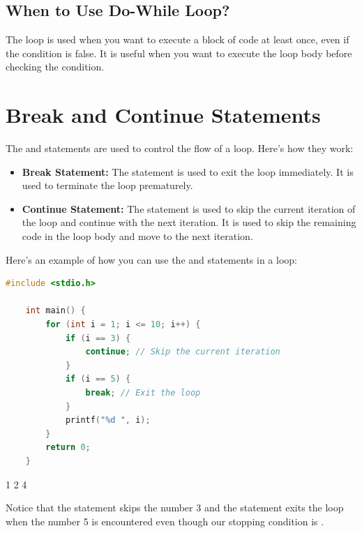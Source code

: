 \documentclass[12pt, openany]{book}
\begin{document}
\subsection{When to Use Do-While Loop?}
The  loop is used when you want to execute a block of code at least once, even if the condition is false. It is useful when you want to execute the loop body before checking the condition.

\section{Break and Continue Statements}
The  and  statements are used to control the flow of a loop. Here's how they work:
\begin{itemize}
    \item \textbf{Break Statement:} The  statement is used to exit the loop immediately. It is used to terminate the loop prematurely.
    \item \textbf{Continue Statement:} The  statement is used to skip the current iteration of the loop and continue with the next iteration. It is used to skip the remaining code in the loop body and move to the next iteration.
\end{itemize}

\clearpage
\noindent Here's an example of how you can use the  and  statements in a loop:
\begin{lstlisting}[language=C, gobble=0, caption=Using Break and Continue Statements in C]
    #include <stdio.h>
    
    int main() {
        for (int i = 1; i <= 10; i++) {
            if (i == 3) {
                continue; // Skip the current iteration
            }
            if (i == 5) {
                break; // Exit the loop
            }
            printf("%d ", i);
        }
        return 0;
    }
\end{lstlisting}
\begin{tcolorbox}[colback=lightgray!10, colframe=black, title=Output]
    1 2 4
\end{tcolorbox}

\begin{infobox}
    Notice that the  statement skips the number 3 and the  statement exits the loop when the number 5 is encountered even though our stopping condition is .
\end{infobox}
\end{document}
